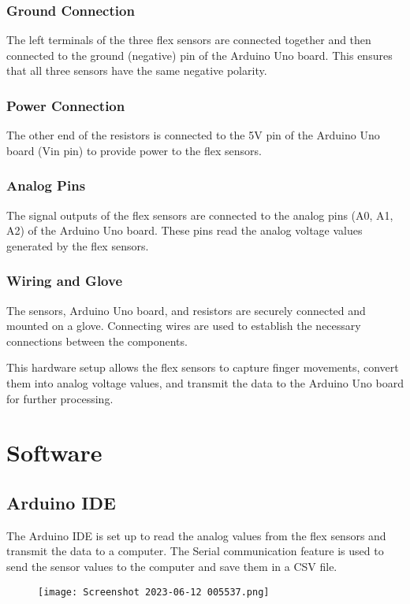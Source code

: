 \documentclass[a4paper,12pt,oneside]{report}
\begin{document}
 \subsubsection{Ground Connection}
The left terminals of the three flex sensors are
connected together and then connected to the ground (negative)
pin of the Arduino Uno board. This ensures that all three sensors
have the same negative polarity.


\subsubsection{Power Connection}
The other end of the resistors is connected to
the 5V pin of the Arduino Uno board (Vin pin) to provide power to
the flex sensors.

\subsubsection{Analog Pins}
The signal outputs of the flex sensors are connected
to the analog pins (A0, A1, A2) of the Arduino Uno board. These
pins read the analog voltage values generated by the flex sensors.
\subsubsection{Wiring and Glove}
The sensors, Arduino Uno board, and resistors
are securely connected and mounted on a glove. Connecting wires
are used to establish the necessary connections between the
components.

This hardware setup allows the flex sensors to capture finger
movements, convert them into analog voltage values, and transmit the
data to the Arduino Uno board for further processing.

 
 
 
 \section{Software}
	
 \subsection{Arduino IDE}
 The Arduino IDE is set up to read the analog values
from the flex sensors and transmit the data to a computer. The
Serial communication feature is used to send the sensor values to
the computer and save them in a CSV file.
\begin{figure}[h]
    \centering
    \begin{minipage}{0.5\textwidth}
        \centering
        \texttt{[image: Screenshot 2023-06-12 005537.png]}
        \label{fig:flex-sensor}
    \end{minipage}
\end{figure}
\\
\end{document}
